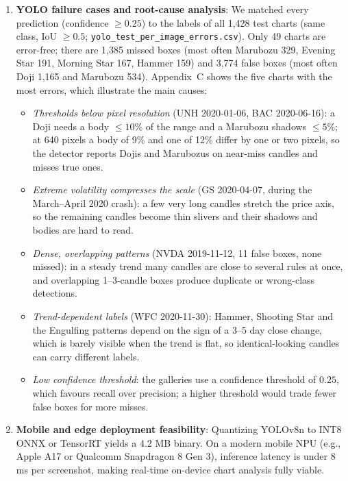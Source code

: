\documentclass[10pt,journal]{IEEEtran}
\begin{document}
\begin{enumerate}
  \item \textbf{YOLO failure cases and root-cause analysis}:
  We matched every prediction (confidence $\ge 0.25$) to the labels of all 1,428 test charts (same class, IoU $\ge 0.5$; \texttt{yolo\_test\_per\_image\_errors.csv}). Only 49 charts are error-free; there are 1,385 missed boxes (most often Marubozu 329, Evening Star 191, Morning Star 167, Hammer 159) and 3,774 false boxes (most often Doji 1,165 and Marubozu 534). Appendix~C shows the five charts with the most errors, which illustrate the main causes:
  \begin{itemize}
    \item \textit{Thresholds below pixel resolution} (UNH 2020-01-06, BAC 2020-06-16): a Doji needs a body $\le 10\%$ of the range and a Marubozu shadows $\le 5\%$; at 640 pixels a body of 9\% and one of 12\% differ by one or two pixels, so the detector reports Dojis and Marubozus on near-miss candles and misses true ones.
    \item \textit{Extreme volatility compresses the scale} (GS 2020-04-07, during the March--April 2020 crash): a few very long candles stretch the price axis, so the remaining candles become thin slivers and their shadows and bodies are hard to read.
    \item \textit{Dense, overlapping patterns} (NVDA 2019-11-12, 11 false boxes, none missed): in a steady trend many candles are close to several rules at once, and overlapping 1--3-candle boxes produce duplicate or wrong-class detections.
    \item \textit{Trend-dependent labels} (WFC 2020-11-30): Hammer, Shooting Star and the Engulfing patterns depend on the sign of a 3--5 day close change, which is barely visible when the trend is flat, so identical-looking candles can carry different labels.
    \item \textit{Low confidence threshold}: the galleries use a confidence threshold of $0.25$, which favours recall over precision; a higher threshold would trade fewer false boxes for more misses.
  \end{itemize}
  
  \item \textbf{Mobile and edge deployment feasibility}:
  Quantizing YOLOv8n to INT8 ONNX or TensorRT yields a 4.2 MB binary. On a modern mobile NPU (e.g., Apple A17 or Qualcomm Snapdragon 8 Gen 3), inference latency is under 8 ms per screenshot, making real-time on-device chart analysis fully viable.
\end{enumerate}
\end{document}
